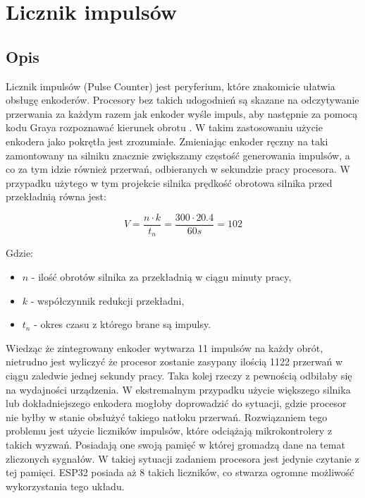     \section{Licznik impulsów}
        \subsection{Opis}
            Licznik impulsów (Pulse Counter) jest peryferium, które znakomicie ułatwia obsługę enkoderów. Procesory bez takich udogodnień są skazane na odczytywanie przerwania za każdym razem jak enkoder wyśle impuls, aby następnie za pomocą kodu Graya rozpoznawać kierunek obrotu \cite{gray}. W takim zastosowaniu użycie enkodera jako pokrętła jest zrozumiałe. Zmieniając enkoder ręczny na taki zamontowany na silniku znacznie zwiększamy częstość generowania impulsów, a co za tym idzie również przerwań, odbieranych w sekundzie pracy procesora. W przypadku użytego w tym projekcie silnika prędkość obrotowa silnika przed przekładnią równa jest:
            
            \begin{displaymath}
              V = \frac{ n \cdot k}{t_{n}} = \frac{ 300 \cdot 20.4 }{60s} = 102
            \end{displaymath}
            
            Gdzie:
            \begin{itemize}
                \item $n$ - ilość obrotów silnika za przekładnią w ciągu minuty pracy,
                \item $k$ - współczynnik redukcji przekładni,
                \item $t_{n}$ - okres czasu z którego brane są impulsy.
            \end{itemize}
            
            Wiedząc że zintegrowany enkoder wytwarza 11 impulsów na każdy obrót, nietrudno jest wyliczyć że procesor zostanie zasypany ilością 1122 przerwań w ciągu zaledwie jednej sekundy pracy. Taka kolej rzeczy z pewnością odbiłaby się na wydajności urządzenia. W ekstremalnym przypadku użycie większego silnika lub dokładniejszego enkodera mogłoby doprowadzić do sytuacji, gdzie procesor nie byłby w stanie obsłużyć takiego natłoku przerwań. Rozwiązaniem tego problemu jest użycie liczników impulsów, które odciążają mikrokontrolery z takich wyzwań. Posiadają one swoją pamięć w której gromadzą dane na temat zliczonych sygnałów. W takiej sytuacji zadaniem procesora jest jedynie czytanie z tej pamięci. ESP32 posiada aż 8 takich liczników, co stwarza ogromne możliwość wykorzystania tego układu.
            
